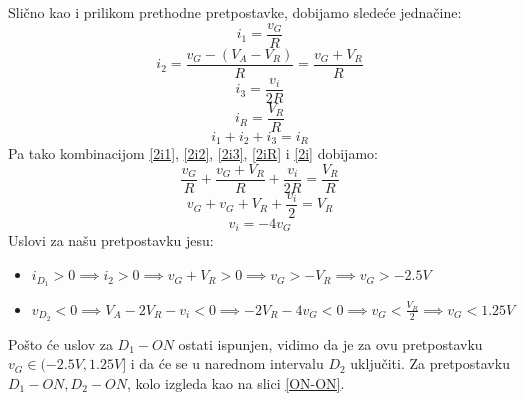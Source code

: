 \documentclass{article}
\begin{document}
\begin{enumerate}[itemsep=\baselineskip]
        Slično kao i prilikom prethodne pretpostavke, dobijamo sledeće jednačine:
        \begin{equation}
            \label{2i1}
            i_1 = \frac{v_G}{R}
        \end{equation}
        \begin{equation}
            \label{2i2}
            i_2 = \frac{v_G - (V_A - V_R)}{R} = \frac{v_G + V_R}{R}
        \end{equation}
        \begin{equation}
            \label{2i3}
            i_3 = \frac{v_i}{2R}
        \end{equation}
        \begin{equation}
            \label{2iR}
            i_R = \frac{V_R}{R}
        \end{equation}
        \begin{equation}
            \label{2i}
            i_1 + i_2 + i_3 = i_R
        \end{equation}
        Pa tako kombinacijom \eqref{2i1}, \eqref{2i2}, \eqref{2i3}, \eqref{2iR} i \eqref{2i} dobijamo:
        $$\frac{v_G}{R} + \frac{v_G + V_R}{R} + \frac{v_i}{2R} = \frac{V_R}{R}$$
        $$v_G + v_G + V_R + \frac{v_i}{2} = V_R$$
        \begin{equation}
            \label{2vi}
            \boxed{v_i = -4v_G}
        \end{equation}
        Uslovi za našu pretpostavku jesu:
        \begin{itemize}
            \item $i_{D_1} > 0 \implies i_2 > 0 \implies v_G + V_R > 0 \implies v_G > -V_R \implies v_G > -2.5V$
            \item $v_{D_2} < 0 \implies V_A - 2V_R - v_i < 0 \implies -2V_R - 4v_G < 0 \implies v_G < \frac{V_R}{2} \implies v_G < 1.25V$
        \end{itemize}
        Pošto će uslov za $D_1-ON$ ostati ispunjen, vidimo da je za ovu pretpostavku $v_G \in (-2.5V, 1.25V]$ i da će se u narednom intervalu $D_2$ uključiti. Za pretpostavku $D_1-ON, D_2-ON$, kolo izgleda kao na slici \ref{ON-ON}.


\end{enumerate}
\end{document}
